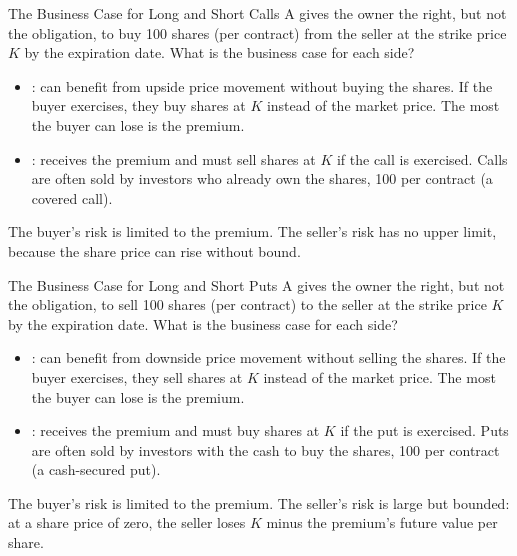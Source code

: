 \documentclass[aspectratio=169,11pt]{beamer}
\begin{document}
\begin{frame}{The Business Case for Long and Short Calls}
  A  gives the owner the right, but not the obligation, to buy 100
  shares (per contract) from the seller at the strike price $K$ by the
  expiration date. What is the business case for each side?
  \begin{itemize}\setlength{\itemsep}{0.6em}
    \item {}: can benefit from upside price movement without
      buying the shares. If the buyer exercises, they buy shares at $K$ instead
      of the market price. The most the buyer can lose is the premium.
    \item {}: receives the premium and must sell shares at
      $K$ if the call is exercised. Calls are often sold by investors who
      already own the shares, 100 per contract (a covered call).
  \end{itemize}
  \vspace{0.3em}
  The buyer's risk is limited to the premium. The seller's risk has no upper
  limit, because the share price can rise without bound.
\end{frame}

\begin{frame}{The Business Case for Long and Short Puts}
  A  gives the owner the right, but not the obligation, to sell 100
  shares (per contract) to the seller at the strike price $K$ by the expiration
  date. What is the business case for each side?
  \begin{itemize}\setlength{\itemsep}{0.6em}
    \item {}: can benefit from downside price movement
      without selling the shares. If the buyer exercises, they sell shares at
      $K$ instead of the market price. The most the buyer can lose is the
      premium.
    \item {}: receives the premium and must buy shares at
      $K$ if the put is exercised. Puts are often sold by investors with the
      cash to buy the shares, 100 per contract (a cash-secured put).
  \end{itemize}
  \vspace{0.3em}
  The buyer's risk is limited to the premium. The seller's risk is large but
  bounded: at a share price of zero, the seller loses $K$ minus the premium's
  future value per share.
\end{frame}
\end{document}
